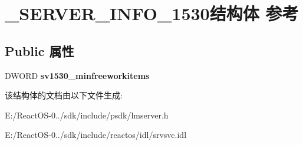 \hypertarget{struct___s_e_r_v_e_r___i_n_f_o__1530}{}\section{\+\_\+\+S\+E\+R\+V\+E\+R\+\_\+\+I\+N\+F\+O\+\_\+1530结构体 参考}
\label{struct___s_e_r_v_e_r___i_n_f_o__1530}
\subsection*{Public 属性}
\begin{DoxyCompactItemize}
\item 
\mbox{\label{struct___s_e_r_v_e_r___i_n_f_o__1530_ae35b3c864dba6e95b8e6f12872d3fc66}} 
D\+W\+O\+RD {\bfseries sv1530\+\_\+minfreeworkitems}
\end{DoxyCompactItemize}


该结构体的文档由以下文件生成\+:\begin{DoxyCompactItemize}
\item 
E\+:/\+React\+O\+S-\/0../sdk/include/psdk/lmserver.\+h\item 
E\+:/\+React\+O\+S-\/0../sdk/include/reactos/idl/srvsvc.\+idl\end{DoxyCompactItemize}
